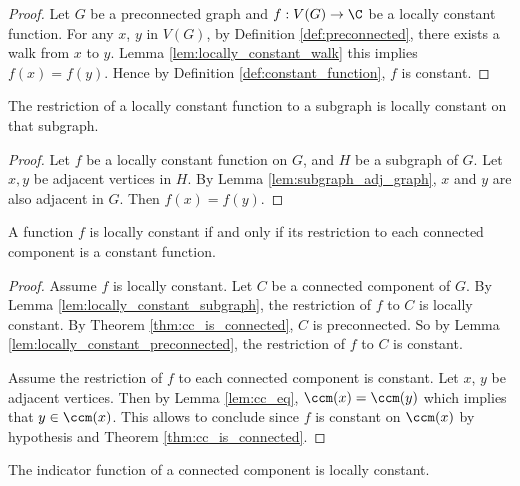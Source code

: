 \begin{proof}
  Let $G$ be a preconnected graph and $f : V(G) \rightarrow \C$ be a locally
  constant function.
  For any $x$, $y$ in $V(G)$, by Definition \ref{def:preconnected}, there
  exists a walk from $x$ to $y$. Lemma \ref{lem:locally_constant_walk}
  this implies $f(x)=f(y)$. Hence by Definition \ref{def:constant_function},
  $f$ is constant.
\end{proof}

\begin{lemma}
  \label{lem:locally_constant_subgraph}
  The restriction of a locally constant function
  to a subgraph is locally constant on that subgraph.
\end{lemma}

\begin{proof}
  Let $f$ be a locally constant function on $G$, and $H$ be a subgraph of $G$.
  Let $x, y$ be adjacent vertices in $H$. By Lemma \ref{lem:subgraph_adj_graph},
  $x$ and $y$ are also adjacent in $G$. Then $f(x)=f(y)$.
\end{proof}

\begin{theorem}
  \label{thm:locally_constant_cc}
  A function $f$ is locally constant if and only if its restriction to each
  connected component is a constant function.
\end{theorem}

\begin{proof}
  Assume $f$ is locally constant. Let $C$ be a connected component of $G$.
  By Lemma \ref{lem:locally_constant_subgraph}, the restriction of $f$ to $C$
  is locally constant.
  By Theorem \ref{thm:cc_is_connected}, $C$ is preconnected.
  So by Lemma \ref{lem:locally_constant_preconnected}, the restriction of $f$ to $C$
  is constant.

  Assume the restriction of $f$ to each connected component is constant.
  Let $x$, $y$ be adjacent vertices. Then by Lemma \ref{lem:cc_eq},
  $\ccm(x) = \ccm(y)$ which implies that $y \in \ccm(x)$. This allows to conclude
  since $f$ is constant on $\ccm(x)$
  by hypothesis and Theorem \ref{thm:cc_is_connected}.
\end{proof}

\begin{lemma}
  \label{lem:indicator_cc_loc_const}
  The indicator function of a connected component is locally constant.
\end{lemma}

